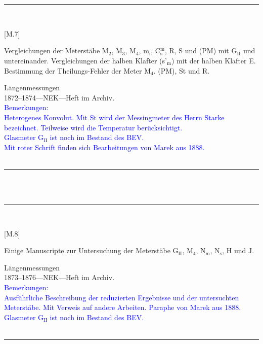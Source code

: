 \\
\vspace*{-2.5pt}\\
\parbox{\textwidth}{%
\rule{\textwidth}{1pt}\vspace*{-3mm}\\
\begin{minipage}[t]{0.2\textwidth}\vspace{0pt}
\Huge\rule[-4mm]{0cm}{1cm}[M.7]
\end{minipage}
\hfill
\begin{minipage}[t]{0.8\textwidth}\vspace{0pt}
\large Vergleichungen der Meterstäbe M$_\mathrm{2}$, M$_\mathrm{3}$, M$_\mathrm{4}$, m$_\mathrm{i}$, C$^\mathrm{m}_\mathrm{s}$, R, S und (PM) mit G$_\mathrm{II}$ und untereinander. Vergleichungen der halben Klafter (s'$_\mathrm{m}$) mit der halben Klafter E. Bestimmung der Theilungs-Fehler der Meter M$_\mathrm{4}$. (PM), St und R.\rule[-2mm]{0mm}{2mm}
\end{minipage}
{\footnotesize\flushright
Längenmessungen\\
}
1872--1874\quad---\quad NEK\quad---\quad Heft im Archiv.\\
\textcolor{blue}{Bemerkungen:\\{}
Heterogenes Konvolut. Mit St wird der {\glqq}Messingmeter des Herrn Starke{\grqq} bezeichnet. Teilweise wird die Temperatur berücksichtigt.\\{}
Glasmeter G$_\mathrm{II}$ ist noch im Bestand des BEV.\\{}
Mit roter Schrift finden sich Bearbeitungen von Marek aus 1888.\\{}
}
\\[-15pt]
\rule{\textwidth}{1pt}
}
\\
\vspace*{-2.5pt}\\
\parbox{\textwidth}{%
\rule{\textwidth}{1pt}\vspace*{-3mm}\\
\begin{minipage}[t]{0.2\textwidth}\vspace{0pt}
\Huge\rule[-4mm]{0cm}{1cm}[M.8]
\end{minipage}
\hfill
\begin{minipage}[t]{0.8\textwidth}\vspace{0pt}
\large Einige Manuscripte zur Untersuchung der Meterstäbe G$_\mathrm{II}$, M$_\mathrm{4}$, N$_\mathrm{m}$, N$_\mathrm{s}$, H und J.\rule[-2mm]{0mm}{2mm}
\end{minipage}
{\footnotesize\flushright
Längenmessungen\\
}
1873--1876\quad---\quad NEK\quad---\quad Heft im Archiv.\\
\textcolor{blue}{Bemerkungen:\\{}
Ausführliche Beschreibung der reduzierten Ergebnisse und der untersuchten Meterstäbe. Mit Verweis auf andere Arbeiten. Paraphe von Marek aus 1888.\\{}
Glasmeter G$_\mathrm{II}$ ist noch im Bestand des BEV.\\{}
}
\\[-15pt]
\rule{\textwidth}{1pt}
}
